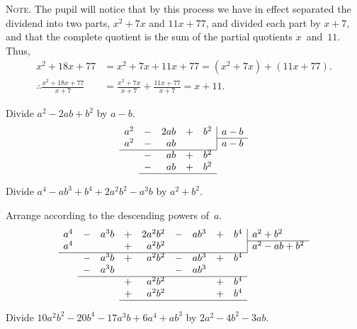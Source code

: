 \documentclass[12pt]{book}[2005/09/16]
\makeatletter
\newenvironment{Remark}[1][]{\par\small\textsc{#1}}{\par}
\newcommand{\Item}[1]{\vspace{4pt plus 16pt}\makebox[1em][r]{\textbf{#1}\ }}
\newcommand{\NoBar}[1]{\multicolumn{1}{@{}r}{#1}}
\makeatother
\begin{document}
\begin{Remark}[Note.]
The pupil will notice that by this process we have in
effect separated the dividend into two parts, $x^{2} + 7x$ and $11x + 77$,
and divided each part by $x + 7$, and that the complete quotient is the
sum of the partial quotients $x$~and~$11$.  Thus,
\begin{align*}
x^{2} + 18x + 77
  &= x^{2} + 7x + 11x + 77 = (x^{2} + 7x) + (11x + 77). \\
\therefore \frac{x^{2} + 18x + 77}{x + 7}
  &= \frac{x^{2} + 7x}{x + 7} + \frac{11x + 77}{x + 7} = x + 11.
\end{align*}
\end{Remark}

\Item{2.}  Divide $a^{2} - 2ab + b^{2}$ by $a - b$.
\[
\begin{array}{r*{2}{cr}|l}
a^{2} &-& 2ab &+& b^{2} & a - b \\
\cline{6-6}
a^{2} &-&  ab & &       & a - b \\
\cline{1-5}
      &-&  ab &+& \NoBar{b^{2}} \\
      &-&  ab &+& \NoBar{b^{2}} \\
\cline{2-5}
\end{array}
\]

\Item{3.}  Divide $a^{4} - ab^{3} + b^{4} + 2a^{2}b^{2} - a^{3}b$ by $a^{2} + b^{2}$.

Arrange according to the descending powers of~$a$.
\[
\begin{array}{r*{4}{cr}|l}
a^{4} &-& a^{3}b &+& 2a^{2}b^{2} &-& ab^{3} &+& b^{4} & a^{2} + b^{2} \\
\cline{10-10}
a^{4} & &        &+&  a^{2}b^{2} & &        & &       & a^{2} - ab + b^{2} \\
\cline{1-9}
      &-& a^{3}b &+&  a^{2}b^{2} &-& ab^{3} &+& \NoBar{b^{4}} \\
      &-& a^{3}b & &             &-& ab^{3} \\
\cline{2-9}
      & &        &+&  a^{2}b^{2} & &        &+& \NoBar{b^{4}} \\
      & &        &+&  a^{2}b^{2} & &        &+& \NoBar{b^{4}} \\
\cline{4-9}
\end{array}
\]

\Item{4.}  Divide $10a^{2}b^{2} - 20b^{4} - 17a^{3}b + 6a^{4} + ab^{3}$
by $2a^{2} - 4b^{2} - 3ab$.
\end{document}
